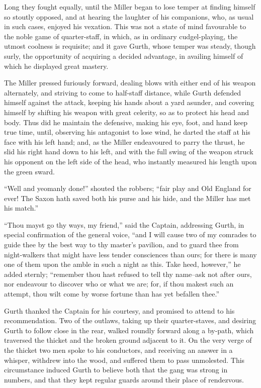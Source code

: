 Long they fought equally, until the Miller began to lose temper at
finding himself so stoutly opposed, and at hearing the laughter of his
companions, who, as usual in such cases, enjoyed his vexation. This was
not a state of mind favourable to the noble game of quarter-staff, in
which, as in ordinary cudgel-playing, the utmost coolness is requisite;
and it gave Gurth, whose temper was steady, though surly, the
opportunity of acquiring a decided advantage, in availing himself of
which he displayed great mastery.

The Miller pressed furiously forward, dealing blows with either end of
his weapon alternately, and striving to come to half-staff distance,
while Gurth defended himself against the attack, keeping his hands about
a yard asunder, and covering himself by shifting his weapon with great
celerity, so as to protect his head and body. Thus did he maintain the
defensive, making his eye, foot, and hand keep true time, until,
observing his antagonist to lose wind, he darted the staff at his face
with his left hand; and, as the Miller endeavoured to parry the thrust,
he slid his right hand down to his left, and with the full swing of the
weapon struck his opponent on the left side of the head, who instantly
measured his length upon the green sward.

``Well and yeomanly done!'' shouted the robbers; ``fair play and Old
England for ever! The Saxon hath saved both his purse and his hide, and
the Miller has met his match.''

``Thou mayst go thy ways, my friend,'' said the Captain, addressing
Gurth, in special confirmation of the general voice, ``and I will cause
two of my comrades to guide thee by the best way to thy master's
pavilion, and to guard thee from night-walkers that might have less
tender consciences than ours; for there is many one of them upon the
amble in such a night as this. Take heed, however,'' he added sternly;
``remember thou hast refused to tell thy name--ask not after ours, nor
endeavour to discover who or what we are; for, if thou makest such an
attempt, thou wilt come by worse fortune than has yet befallen thee.''

Gurth thanked the Captain for his courtesy, and promised to attend to
his recommendation. Two of the outlaws, taking up their quarter-staves,
and desiring Gurth to follow close in the rear, walked roundly forward
along a by-path, which traversed the thicket and the broken ground
adjacent to it. On the very verge of the thicket two men spoke to his
conductors, and receiving an answer in a whisper, withdrew into the
wood, and suffered them to pass unmolested. This circumstance induced
Gurth to believe both that the gang was strong in numbers, and that they
kept regular guards around their place of rendezvous.


